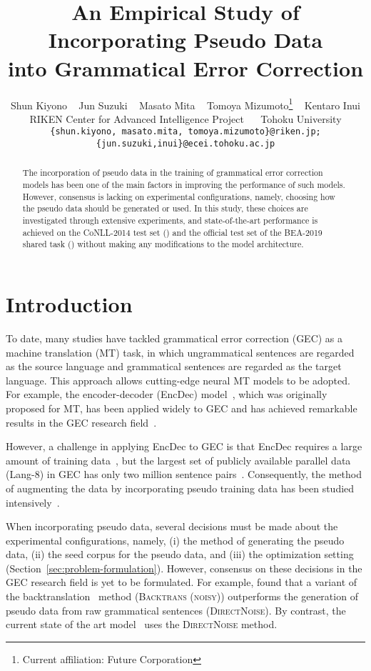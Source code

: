 \documentclass[11pt,a4paper]{article}
\title{An Empirical Study of Incorporating Pseudo Data\\into Grammatical Error Correction}
\author{
  Shun Kiyono ~ Jun Suzuki ~ Masato Mita ~ Tomoya Mizumoto\thanks{\; Current affiliation: Future Corporation}  ~ Kentaro Inui \\
     RIKEN Center for Advanced Intelligence Project ~~  Tohoku University \\
   \texttt{\{shun.kiyono, masato.mita, tomoya.mizumoto\}@riken.jp;} \\ 
   \texttt{\{jun.suzuki,inui\}@ecei.tohoku.ac.jp} \\ 
}
\date{}
\newcommand{\backtrans}{\textsc{Backtrans (noisy)}}
\newcommand{\directnoise}{\textsc{DirectNoise}}
\begin{document}
\maketitle
\begin{abstract}
The incorporation of pseudo data in the training of grammatical error correction models has been one of the main factors in improving the performance of such models.
However, consensus is lacking on experimental configurations, namely, choosing how the pseudo data should be generated or used. 
In this study, these choices are investigated through extensive experiments, and state-of-the-art performance is achieved on the CoNLL-2014 test set () and the official test set of the BEA-2019 shared task () without making any modifications to the model architecture.
\end{abstract}


\section{Introduction}
To date, many studies have tackled grammatical error correction (GEC) as a machine translation (MT) task, in which ungrammatical sentences are regarded as the source language and grammatical sentences are regarded as the target language.
This approach allows cutting-edge neural MT models to be adopted.
For example, the encoder-decoder (EncDec) model~\citep{sutskever:2014:NIPS,bahdanau:2015:ICLR}, which was originally proposed for MT, has been applied widely to GEC and has achieved remarkable results in the GEC research field~\citep{ji:2017:nested,chollampatt:2018:AAAI,junczys:2018:NAACL}.

However, a challenge in applying EncDec to GEC is that EncDec requires a large amount of training data~\citep{koehn:2017:NMT}, but the largest set of publicly available parallel data (Lang-8) in GEC has only two million sentence pairs~\citep{mizumoto:2011:IJCNLP}.
Consequently, the method of augmenting the data by incorporating pseudo training data has been studied intensively~\citep{xie:2018:NAACL,ge:2018:ACL,lichtarge2019corpora,zhao2019improving}.

When incorporating pseudo data, several decisions must be made about the experimental configurations, namely, (i) the method of generating the pseudo data, (ii) the seed corpus for the pseudo data, and (iii) the optimization setting (Section~\ref{sec:problem-formulation}).
However, consensus on these decisions in the GEC research field is yet to be formulated.
For example, \citet{xie:2018:NAACL} found that a variant of the backtranslation~\citep{sennrich:2016:backtrans} method (\backtrans{}) outperforms the generation of pseudo data from raw grammatical sentences (\directnoise{}).
By contrast, the current state of the art model~\citep{zhao2019improving} uses the \directnoise{} method.
\end{document}
